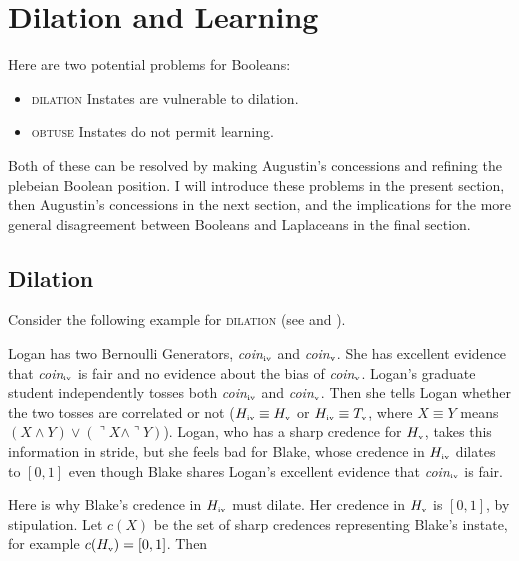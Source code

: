 \documentclass[12pt]{article}
\begin{document}
\section{Dilation and Learning}
\label{DilationLearningAndEntropy}

Here are two potential problems for Booleans:

\begin{itemize}
\item \textsc{dilation} Instates are vulnerable to dilation.
\item \textsc{obtuse} Instates do not permit learning.
\end{itemize}

Both of these can be resolved by making Augustin's concessions and
refining the plebeian Boolean position. I will introduce these
problems in the present section, then Augustin's concessions in the
next section, and the implications for the more general disagreement
between Booleans and Laplaceans in the final section.

\subsection{Dilation}
\label{dilation}

Consider the following example for \textsc{dilation} (see
 and ).

\begin{quotex}
  \label{ex:dilation} Logan has two Bernoulli
  Generators, \textit{coin}$_{\mbox{\tiny{iv}}}$ and
  \textit{coin}$_{\mbox{\tiny{v}}}$. She has excellent evidence that
  \textit{coin}$_{\mbox{\tiny{iv}}}$ is fair and no evidence about the
  bias of \textit{coin}$_{\mbox{\tiny{v}}}$. Logan's graduate student
  independently tosses both \textit{coin}$_{\mbox{\tiny{iv}}}$ and
  \textit{coin}$_{\mbox{\tiny{v}}}$. Then she tells Logan whether the
  two tosses are correlated or not
  ($H_{\mbox{\tiny{iv}}}\equiv{}H_{\mbox{\tiny{v}}}$ or
  $H_{\mbox{\tiny{iv}}}\equiv{}T_{\mbox{\tiny{v}}}$, where
  $X\equiv{}Y$ means
  $(X\wedge{}Y)\vee(\urcorner{}X\wedge\urcorner{}Y)$). Logan, who has
  a sharp credence for $H_{\mbox{\tiny{v}}}$, takes this information
  in stride, but she feels bad for Blake, whose credence in
  $H_{\mbox{\tiny{iv}}}$ dilates to $[0,1]$ even though Blake shares
  Logan's excellent evidence that \textit{coin}$_{\mbox{\tiny{iv}}}$
  is fair.
\end{quotex}

Here is why Blake's credence in $H_{\mbox{\tiny{iv}}}$ must dilate. Her
credence in $H_{\mbox{\tiny{v}}}$ is $[0,1]$, by stipulation. Let
$c(X)$ be the set of sharp credences representing Blake's instate, for
example $c(H_{\mbox{\tiny{v}}})=[0,1]$. Then
\end{document}
